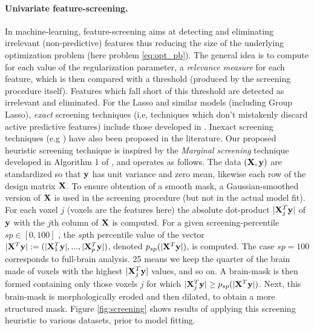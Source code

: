 \paragraph{Univariate feature-screening.}
In machine-learning, feature-screening aims at detecting and
eliminating irrelevant (non-predictive)
features thus reducing the size of the underlying
optimization problem (here problem \eqref{eq:opt_pb}). The general idea
is to compute for each value of the regularization parameter, a
\textit{relevance measure} for each feature, which is then compared with a
threshold (produced by the screening procedure itself). Features which fall short
of this threshold are detected as irrelevant and eliminated. For the
Lasso and similar models (including Group Lasso),
\textit{exact}
screening techniques (i.e, techniques
  which don't mistakenly discard active predictive features) include those developed in
 \citep{elghaoui2010,lee2014exact,liu2014safe,wang2015lasso}. Inexact
screening techniques (e.g  \citep{tibshirani2010strong}) have also been
proposed in the literature.
Our proposed heuristic screening technique is inspired by the
\textit{Marginal screening} technique developed in Algorithm 1 of
 \citep{lee2014exact}, and operates as
follows. The data $(\mathbf{X},\mathbf{y})$ are standardized so that $\mathbf{y}$ has unit
variance and zero mean, likewise each row of the design matrix $\mathbf{X}$. To
ensure obtention of a smooth mask, a Gaussian-smoothed version
of $\mathbf{X}$ is used in the screening procedure (but not in the actual model
fit).
For each voxel $j$ (voxels are the features here) the
absolute dot-product $|\mathbf{X}^T_j\mathbf{y}|$ of $\mathbf{y}$ with the $j$th column of
$\mathbf{X}$ is computed.
For a given screening-percentile
$sp \in [0, 100]$ , the $sp$th percentile value of the
vector $|\mathbf{X}^T\mathbf{y}| := (|\mathbf{X}^T_1\mathbf{y}|, ..., |\mathbf{X}^T_p\mathbf{y}|)$, denoted $p_{sp}(|\mathbf{X}^T\mathbf{y}|)$,
is computed. The case $sp=100$ corresponds to full-brain analysis. 25
means we keep the quarter of the brain made of voxels with the highest
$|\mathbf{X}^T_j\mathbf{y}|$ values, and so on.
A brain-mask is then formed containing only those voxels $j$
for which $|\mathbf{X}^T_j\mathbf{y}| \ge p_{sp}(|\mathbf{X}^T\mathbf{y}|)$. Next, this brain-mask is
morphologically eroded
and then
dilated, to obtain a more structured mask.  Figure
\ref{fig:screening} shows results of applying this screening heuristic
to various datasets, prior to model fitting.

